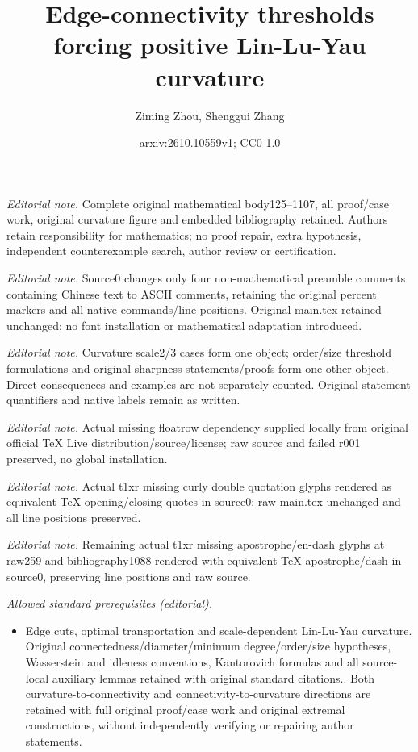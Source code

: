 \documentclass[10pt,a4paper]{article}
\title{Edge-connectivity thresholds forcing positive Lin-Lu-Yau curvature}
\author{Ziming Zhou, Shenggui Zhang}
\date{arxiv:2610.10559v1; CC0 1.0}
\theoremstyle{definition}
\theoremstyle{definition}
\theoremstyle{nonumber}
\begin{document}
\maketitle
\noindent\textit{Editorial note.} Complete original mathematical body125--1107, all proof/case work, original curvature figure and embedded bibliography retained. Authors retain responsibility for mathematics; no proof repair, extra hypothesis, independent counterexample search, author review or certification.\par\medskip
\noindent\textit{Editorial note.} Source0 changes only four non-mathematical preamble comments containing Chinese text to ASCII comments, retaining the original percent markers and all native commands/line positions. Original main.tex retained unchanged; no font installation or mathematical adaptation introduced.\par\medskip
\noindent\textit{Editorial note.} Curvature scale2/3 cases form one object; order/size threshold formulations and original sharpness statements/proofs form one other object. Direct consequences and examples are not separately counted. Original statement quantifiers and native labels remain as written.\par\medskip
\noindent\textit{Editorial note.} Actual missing floatrow dependency supplied locally from original official TeX Live distribution/source/license; raw source and failed r001 preserved, no global installation.\par\medskip
\noindent\textit{Editorial note.} Actual t1xr missing curly double quotation glyphs rendered as equivalent TeX opening/closing quotes in source0; raw main.tex unchanged and all line positions preserved.\par\medskip
\noindent\textit{Editorial note.} Remaining actual t1xr missing apostrophe/en-dash glyphs at raw259 and bibliography1088 rendered with equivalent TeX apostrophe/dash in source0, preserving line positions and raw source.\par\medskip
\noindent\textit{Allowed standard prerequisites (editorial).}\begin{itemize}
\item Edge cuts, optimal transportation and scale-dependent Lin-Lu-Yau curvature. Original connectedness/diameter/minimum degree/order/size hypotheses, Wasserstein and idleness conventions, Kantorovich formulas and all source-local auxiliary lemmas retained with original standard citations.. Both curvature-to-connectivity and connectivity-to-curvature directions are retained with full original proof/case work and original extremal constructions, without independently verifying or repairing author statements.
\end{itemize}\medskip
\end{document}
